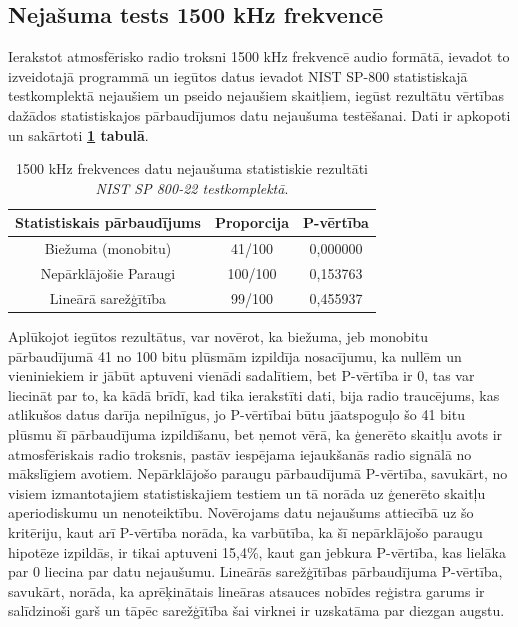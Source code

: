 \documentclass[12pt]{article}
\begin{document}
    \subsection{Nejašuma tests 1500 kHz frekvencē}
    Ierakstot atmosfērisko radio troksni 1500 kHz frekvencē audio formātā, ievadot to izveidotajā programmā un iegūtos datus ievadot NIST SP-800 statistiskajā testkomplektā nejaušiem un pseido nejaušiem skaitļiem, iegūst rezultātu vērtības dažādos statistiskajos pārbaudījumos datu nejaušuma testēšanai. Dati ir apkopoti un sakārtoti \textbf{\ref{rezultati_1500} tabulā}.

\begin{table}[!ht]
\centering


\begin{tabular}{ |c|c|c| }%
\hline
Statistiskais pārbaudījums & Proporcija & P-vērtība \\
\hline
Biežuma (monobitu) & 41/100 & 0,000000\\
\hline
Nepārklājošie Paraugi & 100/100 & 0,153763 \\
\hline
Lineārā sarežģītība & 99/100 & 0,455937 \\
\hline
\end{tabular}

\caption{1500 kHz frekvences datu nejaušuma statistiskie rezultāti \\ \emph{NIST SP 800-22 testkomplektā}.\parencite{NIST_orig}}

\label{rezultati_1500}
\end{table}

  \FloatBarrier  
    
    Aplūkojot iegūtos rezultātus, var novērot, ka  biežuma, jeb monobitu pārbaudījumā 41 no 100 bitu plūsmām izpildīja nosacījumu, ka nullēm un vieniniekiem ir jābūt aptuveni vienādi sadalītiem, bet P-vērtība ir 0, tas var liecināt par to, ka kādā brīdī, kad tika ierakstīti dati, bija radio traucējums, kas atlikušos datus darīja nepilnīgus, jo P-vērtībai būtu jāatspoguļo šo 41 bitu plūsmu šī pārbaudījuma izpildīšanu, bet ņemot vērā, ka ģenerēto skaitļu avots ir atmosfēriskais radio troksnis, pastāv iespējama iejaukšanās radio signālā no mākslīgiem avotiem. Nepārklājošo paraugu pārbaudījumā P-vērtība, savukārt, no visiem izmantotajiem statistiskajiem testiem un tā norāda uz ģenerēto skaitļu aperiodiskumu un nenoteiktību. Novērojams datu nejaušums attiecībā uz šo kritēriju, kaut arī P-vērtība norāda, ka varbūtība, ka šī nepārklājošo paraugu hipotēze izpildās, ir tikai aptuveni 15,4\%, kaut gan jebkura P-vērtība, kas lielāka par 0 liecina par datu nejaušumu.
    Lineārās sarežģītības pārbaudījuma P-vērtība, savukārt, norāda, ka aprēķinātais lineāras atsauces nobīdes reģistra garums ir salīdzinoši garš un tāpēc sarežģītība šai virknei ir uzskatāma par diezgan augstu.
\end{document}
